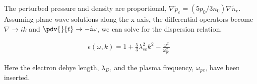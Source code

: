	The perturbed pressure and density are proportional, \(\nabla \tilde{p}_e = \left(5p_0/3n_0\right)\nabla \tilde{n}_e\).
	Assuming plane wave solutions along the x-axis, the differential operators become \(\nabla \rightarrow ik\)
 	and \(\pdv{}{t} \rightarrow -i\omega\), we can solve for the dispersion relation.

	\begin{align}
	\epsilon(\omega, k) = 1 + \frac{5}{3} \lambda_{se}^2k ^2 -  \frac{\omega^2}{\omega_{pe}^2}
	\end{align}

	Here the electron debye length, \(\lambda_{D}\), and the plasma frequency, \(\omega_{pe}\), have been inserted.

%
%
%
